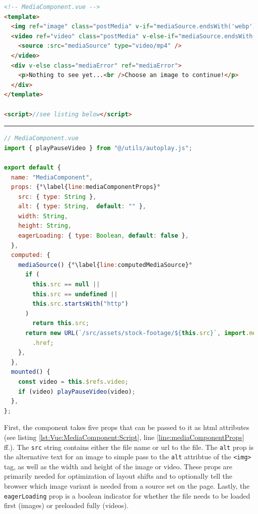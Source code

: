 \documentclass[a4paper, 12pt]{article}
\begin{document}
\vspace{1cm}
\begin{lstlisting}[caption=MediaComponent in Vue.js (Template), label={lst:Vue:MediaComponent:Template}, language=HTML]
<!-- MediaComponent.vue -->
<template>
  <img ref="image" class="postMedia" v-if="mediaSource.endsWith('webp')" :alt="alt" :width="width" :height="height" :loading="eagerLoading ? 'eager' : 'lazy'" :src="mediaSource" />
  <video ref="video" class="postMedia" v-else-if="mediaSource.endsWith('mp4')" :width="width" :preload="eagerLoading ? 'auto' : 'metadata'" controls controlslist="nodownload,nofullscreen,noremoteplayback" disablepictureinpicture loop muted >
    <source :src="mediaSource" type="video/mp4" />
  </video>
  <div v-else class="mediaError" ref="mediaError">
    <p>Nothing to see yet...<br />Choose an image to continue!</p>
  </div>
</template>
  
<script>//see listing below</script>
\end{lstlisting}
\hrule
\begin{lstlisting}[caption=MediaComponent in Vue.js (Script), label={lst:Vue:MediaComponent:Script}, language=JavaScript, firstnumber=13, escapechar=°]
// MediaComponent.vue
import { playPauseVideo } from "@/utils/autoplay.js";

export default {
  name: "MediaComponent",
  props: {°\label{line:mediaComponentProps}°
    src: { type: String },
    alt: { type: String,  default: "" },
    width: String,
    height: String,
    eagerLoading: { type: Boolean, default: false },
  },
  computed: {
    mediaSource() {°\label{line:computedMediaSource}°
      if (
        this.src == null ||
        this.src == undefined ||
        this.src.startsWith("http")
      )
        return this.src;
      return new URL(`/src/assets/stock-footage/${this.src}`, import.meta.url)
        .href;
    },
  },
  mounted() {
    const video = this.$refs.video;
    if (video) playPauseVideo(video);
  },
};
\end{lstlisting}
\vspace{1cm}

First, the component takes five props that can be passed to it as \acrshort{html} attributes (see listing \ref{lst:Vue:MediaComponent:Script}, line \ref{line:mediaComponentProps} ff.).
The \verb|src| string contains either the file name or \acrshort{url} to the file.
The \verb|alt| prop is the alternative text for an image to simple pass to the \verb|alt| attribtue of the \verb|<img>| tag, as well as the width and height of the image or video.
These props are primarily needed for optimization of layout shifts and to optionally tell the browser which image variant is needed from a source set on the page.
Lastly, the \verb|eagerLoading| prop is a boolean indicator for whether the file needs to be loaded first (images) or preloaded fully (videos).
\end{document}
